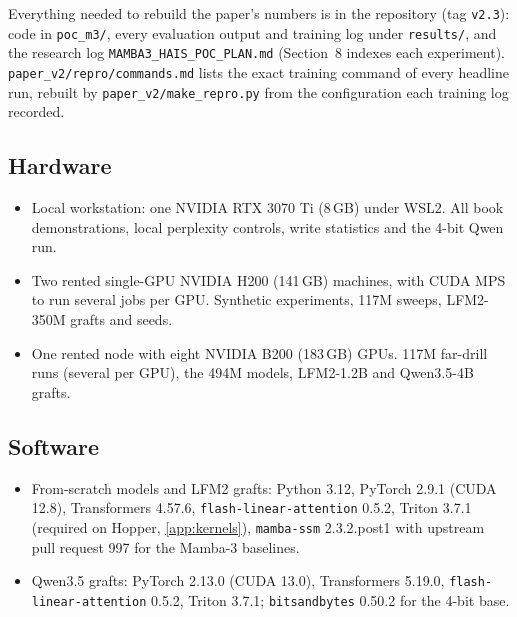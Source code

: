 \sloppy
Everything needed to rebuild the paper's numbers is in the repository (tag \texttt{v2.3}): code in \texttt{poc\_m3/}, every evaluation output and training log under \texttt{results/}, and the research log \texttt{MAMBA3\_HAIS\_POC\_PLAN.md} (Section~8 indexes each experiment). \texttt{paper\_v2/repro/commands.md} lists the exact training command of every headline run, rebuilt by \texttt{paper\_v2/make\_repro.py} from the configuration each training log recorded.

\subsection{Hardware}
\begin{itemize}
\item Local workstation: one NVIDIA RTX 3070 Ti (8\,GB) under WSL2. All book demonstrations, local perplexity controls, write statistics and the 4-bit Qwen run.
\item Two rented single-GPU NVIDIA H200 (141\,GB) machines, with CUDA MPS to run several jobs per GPU. Synthetic experiments, 117M sweeps, LFM2-350M grafts and seeds.
\item One rented node with eight NVIDIA B200 (183\,GB) GPUs. 117M far-drill runs (several per GPU), the 494M models, LFM2-1.2B and Qwen3.5-4B grafts.
\end{itemize}

\subsection{Software}
\begin{itemize}
\item From-scratch models and LFM2 grafts: Python 3.12, PyTorch 2.9.1 (CUDA 12.8), Transformers 4.57.6, \texttt{flash-linear-attention} 0.5.2, Triton 3.7.1 (required on Hopper, \cref{app:kernels}), \texttt{mamba-ssm} 2.3.2.post1 with upstream pull request 997 for the Mamba-3 baselines.
\item Qwen3.5 grafts: PyTorch 2.13.0 (CUDA 13.0), Transformers 5.19.0, \texttt{flash-linear-attention} 0.5.2, Triton 3.7.1; \texttt{bitsandbytes} 0.50.2 for the 4-bit base.
\end{itemize}

